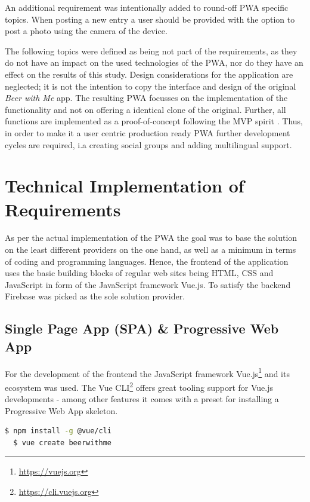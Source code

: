 An additional requirement was intentionally added to round-off PWA specific topics. When posting a new entry a user should be provided with the option to post a photo using the camera of the device.

The following topics were defined as being not part of the requirements, as they do not have an impact on the used technologies of the PWA, nor do they have an effect on the results of this study. Design considerations for the application are neglected; it is not the intention to copy the interface and design of the original \textit{Beer with Me} app. The resulting PWA focusses on the implementation of the functionality and not on offering a identical clone of the original. Further, all functions are implemented as a proof-of-concept following the MVP spirit \citep{wikipediaMinimumViableProduct2019}. Thus, in order to make it a user centric production ready PWA further development cycles are required, i.a creating social groups and adding multilingual support.


\section{Technical Implementation of Requirements}
As per the actual implementation of the PWA the goal was to base the solution on the least different providers on the one hand, as well as a minimum in terms of coding and programming languages. Hence, the frontend of the application uses the basic building blocks of regular web sites being HTML, CSS and JavaScript in form of the JavaScript framework Vue.js. To satisfy the backend Firebase was picked as the sole solution provider.

\subsection{Single Page App (SPA) \& Progressive Web App}
For the development of the frontend the JavaScript framework Vue.js\footnote{\url{https://vuejs.org}} and its ecosystem was used. The Vue CLI\footnote{\url{https://cli.vuejs.org}} offers great tooling support for Vue.js developments - among other features it comes with a preset for installing a Progressive Web App skeleton.

\begin{lstlisting}[language=bash, caption=Installation and project creation commands with the Vue Cli, label=lst:vue-cli]
  $ npm install -g @vue/cli
  $ vue create beerwithme
\end{lstlisting}

